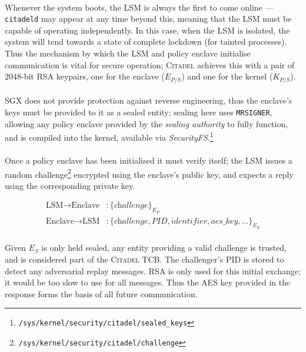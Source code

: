 \paragraph{} Whenever the system boots, the LSM is always the first to come online --- \texttt{citadeld} may appear at any time beyond this, meaning that the LSM must be capable of operating independently. In this case, when the LSM is isolated, the system will tend towards a state of complete lockdown (for tainted processes). Thus the mechanism by which the LSM and policy enclave initialise communication is vital for secure operation; \textsc{Citadel} achieves this with a pair of 2048-bit RSA keypairs, one for the enclave ($E_{P/S}$) and one for the kernel ($K_{P/S}$).

\paragraph{} SGX does not provide protection against reverse engineering, thus the enclave's keys must be provided to it as a sealed entity; sealing here uses \texttt{MRSIGNER}, allowing any policy enclave provided by the \textit{sealing authority} to fully function, and is compiled into the kernel, available via \textit{SecurityFS}.\footnote{\texttt{/sys/kernel/security/citadel/sealed\_keys}}

\paragraph{} Once a policy enclave has been initialised it must verify itself; the LSM issues a random challenge\footnote{\texttt{/sys/kernel/security/citadel/challenge}} encrypted using the enclave's public key, and expects a reply using the corresponding private key.

\vspace{-5mm}
\begin{align*}
    \text{LSM} \rightarrow \text{Enclave} &: \{\textit{challenge}\}_{E_{P}} \\
    \text{Enclave} \rightarrow \text{LSM} &: \{\textit{challenge}, \textit{PID}, \textit{identifier}, \textit{aes\_key}, ...\}_{E_{S}}
\end{align*}

\paragraph{} Given $E_S$ is only held sealed, any entity providing a valid challenge is trusted, and is considered part of the \textsc{Citadel} TCB. The challenger's PID is stored to detect any adversarial replay messages. RSA is only used for this initial exchange; it would be too slow to use for all messages. Thus the AES key provided in the response forms the basis of all future communication.

